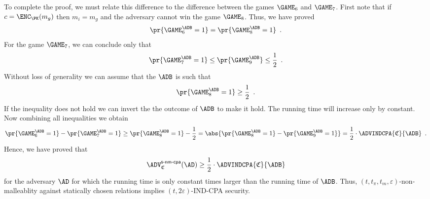 \documentclass{crypto-exercise}
\newcommand{\ADVNMCPA}[2]{\ADV^{\mathsf{s\text{-}nm\text{-}cpa}}_{#1}{(#2)}}
\newcommand{\CS}{\mathfrak{C}}
\theoremstyle{plain}\newtheorem{stmt}{Statement}
\begin{document}
\begin{solution}
To complete the proof, we must relate this difference to the difference between the games $\GAME_6$ and $\GAME_7$. First note that if $c=\ENC_\PK(m_g)$ then $m_i=m_g$ and the adversary cannot win the game $\GAME_8$. Thus, we have proved
\begin{align*}
\pr{\GAME_6^\ADB=1}=\pr{\GAME_8^\ADB=1}\enspace.
\end{align*}
For the game $\GAME_7$, we can conclude only that
\begin{align*}
\pr{\GAME_7^\ADB=1}\leq\pr{\GAME_9^\ADB}\leq \frac{1}{2}\enspace.
\end{align*}
Without loss of generality we can assume that the $\ADB$ is such that
\begin{align*}
\pr{\GAME_8^\ADB=1}\geq \frac{1}{2}\enspace.
\end{align*}
If the inequality does not hold we can invert the the outcome of $\ADB$ to make it hold. The running time will increase only by constant. Now combining all inequalities we obtain 
\begin{align*}
\pr{\GAME_6^\ADB=1}-\pr{\GAME_7^\ADB=1}\geq \pr{\GAME_8^\ADB=1}-\frac{1}{2}= \abs{\pr{\GAME_8^\ADB=1}-\pr{\GAME_9^\ADB=1}}=\frac{1}{2}\cdot\ADVINDCPA{\CS}{\ADB}\enspace.
\end{align*} 
Hence, we have proved that 
\begin{align*}
\ADVNMCPA{\CS}{\AD}\geq\frac{1}{2}\cdot\ADVINDCPA{\CS}{\ADB}
\end{align*}
for the adversary $\AD$ for which the running time is only constant times larger than the running time of $\ADB$. Thus, $(t,t_\pi,t_m,\varepsilon)$-non-malleablity against statically chosen relations implies $(t,2\varepsilon)$-IND-CPA security.

\end{solution}
\end{document}
